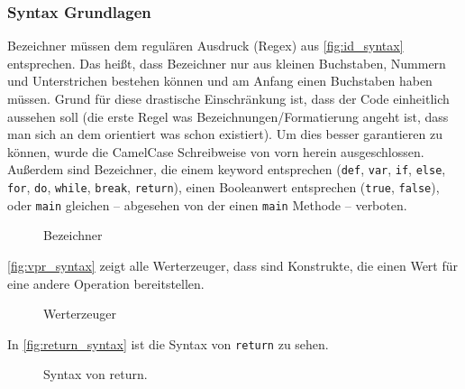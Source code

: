     \subsubsection{Syntax Grundlagen}
    \label{sssec:Syntax Grundlagen}
      Bezeichner müssen dem regulären Ausdruck (Regex) aus \autoref{fig:id_syntax} entsprechen. Das heißt, dass Bezeichner nur aus kleinen Buchstaben, Nummern und Unterstrichen bestehen können und am Anfang einen Buchstaben haben müssen. Grund für diese drastische Einschränkung ist, dass der Code einheitlich aussehen soll (die erste Regel was Bezeichnungen/Formatierung angeht ist, dass man sich an dem orientiert was schon existiert). Um dies besser garantieren zu können, wurde die CamelCase Schreibweise von vorn herein ausgeschlossen. Außerdem sind Bezeichner, die einem keyword entsprechen
      (\lstinline[style=MyMacroStyleIn]$def$, \lstinline[style=MyMacroStyleIn]$var$, \lstinline[style=MyMacroStyleIn]$if$, \lstinline[style=MyMacroStyleIn]$else$, \lstinline[style=MyMacroStyleIn]$for$, \lstinline[style=MyMacroStyleIn]$do$, \lstinline[style=MyMacroStyleIn]$while$, \lstinline[style=MyMacroStyleIn]$break$, \lstinline[style=MyMacroStyleIn]$return$), einen Booleanwert entsprechen (\lstinline[style=MyMacroStyleIn]$true$, \lstinline[style=MyMacroStyleIn]$false$), oder \lstinline[style=MyMacroStyleIn]$main$ gleichen -- abgesehen von der einen \lstinline[style=MyMacroStyleIn]$main$ Methode -- verboten.

      \begin{figure}[H]
        \centering
        \caption{Bezeichner}
        \label{fig:id_syntax}
      \end{figure}

      \autoref{fig:vpr_syntax} zeigt alle Werterzeuger, dass sind Konstrukte, die einen Wert für eine andere Operation bereitstellen.
      \begin{figure}[H]
        \centering
        \caption{Werterzeuger}
        \label{fig:vpr_syntax}
      \end{figure}

      In \autoref{fig:return_syntax} ist die Syntax von \lstinline[style=MyMacroStyleIn]$return$ zu sehen.
      \begin{figure}[H]
        \centering
        \caption{Syntax von return.}
        \label{fig:return_syntax}
      \end{figure}

